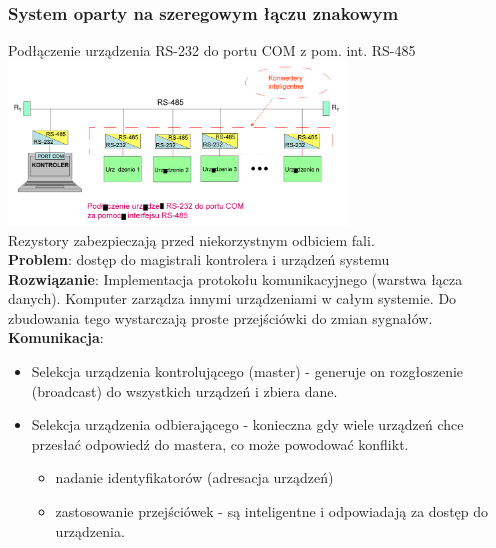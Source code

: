 \documentclass[a4paper,twoside]{article}
\begin{document}
		\subsubsection{System oparty na szeregowym łączu znakowym}
		Podłączenie urządzenia RS-232 do portu COM z pom. int. RS-485\\
		\includegraphics[width=9cm]{./wyklady/RS232_14_1.pdf}\\
		Rezystory zabezpieczają przed niekorzystnym odbiciem fali.\\
		\textbf{Problem}: dostęp do magistrali kontrolera i urządzeń systemu\\
		\textbf{Rozwiązanie}: Implementacja protokołu komunikacyjnego (warstwa łącza danych). Komputer zarządza innymi urządzeniami w całym systemie. Do zbudowania tego wystarczają proste przejściówki do zmian sygnałów.\\
		\textbf{Komunikacja}:
		\begin{itemize}
			\item Selekcja urządzenia kontrolującego (master) - generuje on rozgłoszenie (broadcast) do wszystkich urządzeń i zbiera dane.
			\item Selekcja urządzenia odbierającego - konieczna gdy wiele urządzeń chce przesłać odpowiedź do mastera, co może powodować konflikt.
			\begin{itemize}
				\item nadanie identyfikatorów (adresacja urządzeń)
				\item zastosowanie przejściówek - są inteligentne i odpowiadają za dostęp do urządzenia.
			\end{itemize}
		\end{itemize}
\end{document}
